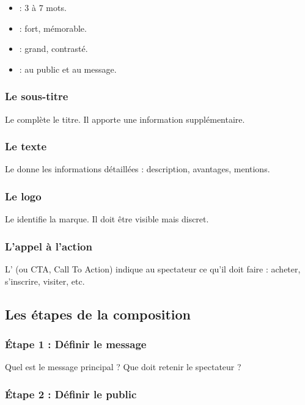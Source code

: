 \begin{itemize}
    \item {} : 3 à 7 mots.
    \item {} : fort, mémorable.
    \item {} : grand, contrasté.
    \item {} : au public et au message.
\end{itemize}

\subsubsection{Le sous-titre}

Le  complète le titre. Il apporte une information supplémentaire.

\subsubsection{Le texte}

Le  donne les informations détaillées : description, avantages, mentions.

\subsubsection{Le logo}

Le  identifie la marque. Il doit être visible mais discret.

\subsubsection{L'appel à l'action}

L' (ou CTA, Call To Action) indique au spectateur ce qu'il doit faire : acheter, s'inscrire, visiter, etc.

\subsection{Les étapes de la composition}

\subsubsection{Étape 1 : Définir le message}

Quel est le message principal ? Que doit retenir le spectateur ?

\subsubsection{Étape 2 : Définir le public}

